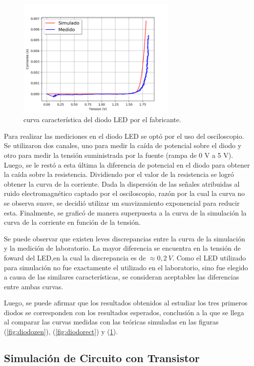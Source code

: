 \documentclass[a4paper]{article}
\begin{document}
\begin{figure}[H]
	\centering
	\includegraphics[width=0.7\textwidth]{CurvaDiodosLed.png}
	\caption{curva característica del diodo LED por el fabricante.}
	\label{fig:diodoled}
\end{figure}
Para realizar las mediciones en el diodo LED se optó por el uso del osciloscopio. Se utilizaron dos canales, uno para medir la caída de potencial sobre el diodo y otro para medir la tensión suministrada por la fuente (rampa de 0 V a 5 V). Luego, se le restó a esta última la diferencia de potencial en el diodo para obtener la caída sobre la resistencia. Dividiendo por el valor de la resistencia se logró obtener la curva de la corriente. Dada la dispersión de las señales atribuidas al ruido electromagnético captado por el osciloscopio, razón por la cual la curva no se observa suave, se decidió utilizar un suavizamiento exponencial para reducir esta. Finalmente, se graficó de manera superpuesta a la curva de la simulación la curva de la corriente en función de la tensión.

Se puede observar que existen leves discrepancias entre la curva de la simulación y la medición de laboratorio. La mayor diferencia se encuentra en la tensión de foward del LED,en  la cual la discrepancia es de $\approx 0,2 \ V$.
Como el LED utilizado para simulación no fue exactamente el utilizado en el laboratorio, sino fue elegido a causa de las similares características, se consideran aceptables las diferencias entre ambas curvas.

Luego, se puede afirmar que los resultados obtenidos al estudiar los tres primeros diodos se corresponden con los resultados esperados, conclusión a la que se llega al comparar las curvas medidas con las teóricas simuladas en las figuras (\ref{fig:diodozen}), (\ref{fig:diodorect}) y (\ref{fig:diodoled}).

\subsection*{Simulación de Circuito con Transistor}
\end{document}
